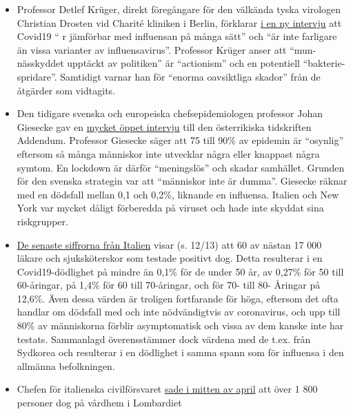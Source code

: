 \begin{itemize}
\tightlist
\item
  Professor Detlef Krüger, direkt föregångare för den välkända tyska
  virologen Christian Drosten vid Charité kliniken i Berlin, förklarar
  \href{https://de.sputniknews.com/interviews/20200425326953541-corona-gefahr-virologe/}{i
  en ny intervju} att Covid19 `` r jämförbar med influensan på många
  sätt'' och ``är inte farligare än vissa varianter av influensavirus''.
  Professor Krüger anser att ``mun-nässkyddet upptäckt av politiken'' är
  ``actionism'' och en potentiell ``bakterie-spridare''. Samtidigt
  varnar han för ``enorma oavsiktliga skador'' från de åtgärder som
  vidtagits.
\item
  Den tidigare svenska och europeiska chefsepidemiologen professor Johan
  Giesecke gav en
  \href{https://www.addendum.org/coronavirus/interview-johan-giesecke/}{mycket
  öppet intervju} till den österrikiska tidskriften Addendum. Professor
  Giesecke säger att 75 till 90\% av epidemin är ``osynlig'' eftersom så
  många människor inte utvecklar några eller knappast några symtom. En
  lockdown är därför ``meningslös'' och skadar samhället. Grunden för
  den svenska strategin var att ``människor inte är dumma''. Giesecke
  räknar med en dödsfall mellan 0,1 och 0,2\%, liknande en influensa.
  Italien och New York var mycket dåligt förberedda på viruset och hade
  inte skyddat sina riskgrupper.
\item
  \href{https://www.epicentro.iss.it/coronavirus/bollettino/Bollettino-sorveglianza-integrata-COVID-19_16-aprile-2020.pdf\#page=13}{De
  senaste siffrorna från Italien} visar (s. 12/13) att 60 av nästan 17
  000 läkare och sjuksköterskor som testade positivt dog. Detta
  resulterar i en Covid19-dödlighet på mindre än 0,1\% för de under 50
  år, av 0,27\% för 50 till 60-åringar, på 1,4\% för 60 till 70-åringar,
  och för 70- till 80- Åringar på 12,6\%. Även dessa värden är troligen
  fortfarande för höga, eftersom det ofta handlar om dödsfall med och
  inte nödvändigtvis av coronavirus, och upp till 80\% av människorna
  förblir asymptomatisk och vissa av dem kanske inte har testats.
  Sammanlagd överensstämmer dock värdena med de t.ex. från Sydkorea och
  resulterar i en dödlighet i samma spann som för influensa i den
  allmänna befolkningen.
\item
  Chefen för italienska civilförsvaret
  \href{https://www.theguardian.com/world/2020/apr/16/italian-police-broaden-care-home-coronavirus-milan}{sade
  i mitten av april} att över 1 800 personer dog på vårdhem i Lombardiet

\end{itemize}
